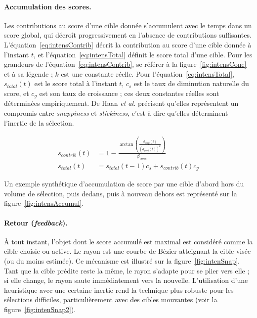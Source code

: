	\paragraph{Accumulation des scores.}
	Les contributions au score d'une cible donnée s'accumulent avec le temps dans un score global, qui décroît progressivement en l'absence de contributions suffisantes. L'équation~\ref{eq:intensContrib} décrit la contribution au score d'une cible donnée à l'instant $t$, et l'équation~\ref{eq:intensTotal} définit le score total d'une cible. Pour les grandeurs de l'équation~\ref{eq:intensContrib}, se référer à la figure~\ref{fig:intensCone} et à sa légende ; $k$ est une constante réelle. Pour l'équation~\ref{eq:intensTotal}, $s_{total}(t)$ est le score total à l'instant $t$, $c_{s}$ est le taux de diminution naturelle du score, et $c_{g}$ est son taux de croissance ; ces deux constantes réelles sont déterminées empiriquement. De Haan \emph{et al.} précisent qu'elles représentent un compromis entre \emph{snappiness} et \emph{stickiness}, c'est-à-dire qu'elles déterminent l'inertie de la sélection.
	
	\begin{align}
		\label{eq:intensContrib}
		s_{contrib}(t) &= 1 - \frac{\arctan \left(\frac{d_{perp}(t)}{\left(d_{proj}(t)\right)^{k}}\right)}{\beta_{cone}} \\
		\label{eq:intensTotal}
		s_{total}(t) &= s_{total}(t-1)c_{s} + s_{contrib}(t)c_{g}
	\end{align}
	
	Un exemple synthétique d'accumulation de score par une cible d'abord hors du volume de sélection, puis dedans, puis à nouveau dehors est représenté sur la figure~\ref{fig:intensAccumul}.


	
	\paragraph{Retour (\emph{feedback}).}
	À tout instant, l'objet dont le score accumulé est maximal est considéré comme la cible choisie ou active. Le rayon est une courbe de Bézier atteignant la cible visée (ou du moins estimée). Ce mécanisme est illustré sur la figure~\ref{fig:intenSnap}. Tant que la cible prédite reste la même, le rayon s'adapte pour se plier vers elle ; si elle change, le rayon saute immédiatement vers la nouvelle. L'utilisation d'une heuristique avec une certaine \og inertie \fg{} rend la technique plus robuste pour les sélections difficiles, particulièrement avec des cibles mouvantes (voir la figure~\ref{fig:intenSnap2}).
	
